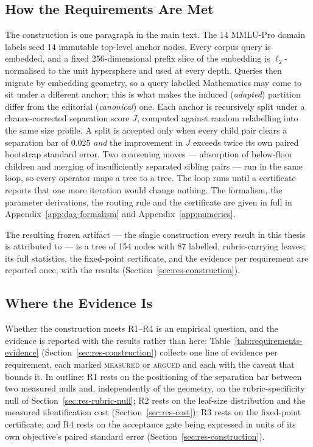 \subsection{How the Requirements Are Met}\label{sec:arch-taxonomy}

The construction is one paragraph in the main text.
The 14 MMLU-Pro domain labels seed 14 immutable top-level anchor nodes.
Every corpus query is embedded, and a fixed 256-dimensional prefix
slice of the embedding is $\ell_2$-normalised to the unit hypersphere
and used at every depth. Queries then migrate by embedding geometry, so
a query labelled Mathematics may come to sit under a different anchor;
this is what makes the induced (\textit{adapted}) partition differ from
the editorial (\textit{canonical}) one.
Each anchor is recursively split under a chance-corrected separation
score $J$, computed against random relabelling into the same size
profile. A split is accepted only when every child pair clears a
separation bar of $0.025$ \emph{and} the improvement in $J$ exceeds
twice its own paired bootstrap standard error. Two coarsening moves
--- absorption of below-floor children and merging of insufficiently
separated sibling pairs --- run in the same loop, so every operator maps
a tree to a tree. The loop runs until a certificate reports that one
more iteration would change nothing.
The formalism, the parameter derivations, the routing rule and the
certificate are given in full in Appendix~\ref{app:dag-formalism} and
Appendix~\ref{app:numerics}.

The resulting frozen artifact --- the single construction every result
in this thesis is attributed to --- is a tree of 154 nodes with 87
labelled, rubric-carrying leaves; its full statistics, the fixed-point
certificate, and the evidence per requirement are reported once, with
the results (Section~\ref{sec:res-construction}).

\subsection{Where the Evidence Is}\label{sec:arch-evidence-pointer}

Whether the construction meets R1--R4 is an empirical question, and
the evidence is reported with the results rather than here:
Table~\ref{tab:requirements-evidence}
(Section~\ref{sec:res-construction}) collects one line of evidence per
requirement, each marked \textsc{measured} or \textsc{argued} and each
with the caveat that bounds it. In outline: R1 rests on the
positioning of the separation bar between two measured nulls and,
independently of the geometry, on the rubric-specificity null of
Section~\ref{sec:res-rubric-null}; R2 rests on the leaf-size
distribution and the measured identification cost
(Section~\ref{sec:res-cost}); R3 rests on the fixed-point certificate;
and R4 rests on the acceptance gate being expressed in units of its
own objective's paired standard error
(Section~\ref{sec:res-construction}).

